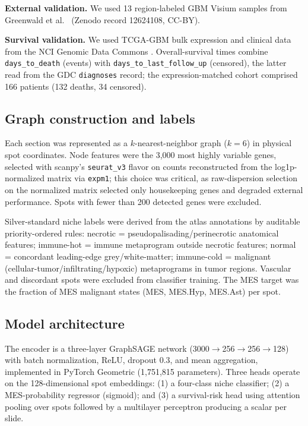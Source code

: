 \documentclass[11pt,letterpaper]{article}
\begin{document}
\textbf{External validation.} We used 13 region-labeled GBM Visium samples from Greenwald et al.\ \cite{greenwald2024} (Zenodo record 12624108, CC-BY).

\textbf{Survival validation.} We used TCGA-GBM bulk expression and clinical data from the NCI Genomic Data Commons \cite{tcga2008}. Overall-survival times combine \texttt{days\_to\_death} (events) with \texttt{days\_to\_last\_follow\_up} (censored), the latter read from the GDC \texttt{diagnoses} record; the expression-matched cohort comprised 166 patients (132 deaths, 34 censored).

\subsection{Graph construction and labels}

Each section was represented as a $k$-nearest-neighbor graph ($k=6$) in physical spot coordinates. Node features were the 3{,}000 most highly variable genes, selected with scanpy's \texttt{seurat\_v3} flavor \cite{wolf2018} on counts reconstructed from the log1p-normalized matrix via \texttt{expm1}; this choice was critical, as raw-dispersion selection on the normalized matrix selected only housekeeping genes and degraded external performance. Spots with fewer than 200 detected genes were excluded.

Silver-standard niche labels were derived from the atlas annotations by auditable priority-ordered rules: necrotic = pseudopalisading/perinecrotic anatomical features; immune-hot = immune metaprogram outside necrotic features; normal = concordant leading-edge grey/white-matter; immune-cold = malignant (cellular-tumor/infiltrating/hypoxic) metaprograms in tumor regions. Vascular and discordant spots were excluded from classifier training. The MES target was the fraction of MES malignant states (MES, MES.Hyp, MES.Ast) per spot.

\subsection{Model architecture}

The encoder is a three-layer GraphSAGE network \cite{hamilton2017} (3000$\rightarrow$256$\rightarrow$256$\rightarrow$128) with batch normalization, ReLU, dropout 0.3, and mean aggregation, implemented in PyTorch Geometric \cite{fey2019} (1{,}751{,}815 parameters). Three heads operate on the 128-dimensional spot embeddings: (1) a four-class niche classifier; (2) a MES-probability regressor (sigmoid); and (3) a survival-risk head using attention pooling over spots followed by a multilayer perceptron producing a scalar per slide.
\end{document}
